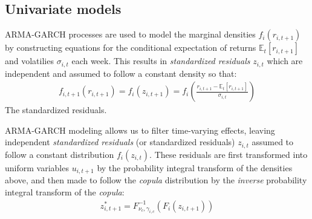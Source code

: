 
\subsection{Univariate models} %
\label{sub:univariate_models}

ARMA-GARCH processes are used to model the marginal densities $f_i(r_{i,t+1})$
by constructing equations for the conditional expectation of returns $\mathbb{E}_t[r_{i,t+1}]$ and volatilies $\sigma_{i,t}$ each week. This results in \emph{standardized residuals} $z_{i,t}$ which are independent and assumed to follow a constant density so that:
\begin{align}
  f_{i,t+1}(r_{i,t+1}) = f_i(z_{i,t+1}) = f_i(\frac{r_{i,t+1} - \mathbb{E}_t[r_{i,t+1}]}{\sigma_{i,t}})
\end{align}
The standardized residuals.

ARMA-GARCH modeling allows us to filter time-varying effects, leaving independent \emph{standardized residuals} (or standardized residuals) $z_{i,t}$ assumed to follow a constant distribution $f_i(z_{i,t})$. These residuals are first transformed into uniform variables $u_{i,t+1}$ by the probability integral transform of the densities above, and then made to follow the \emph{copula} distribution by the \emph{inverse} probability integral transform of the \emph{copula}:
\begin{align}
  z_{i,t+1}^* = F^{-1}_{\nu_c,\gamma_{i,c}}(F_{i}(z_{i,t+1}))
\end{align}

